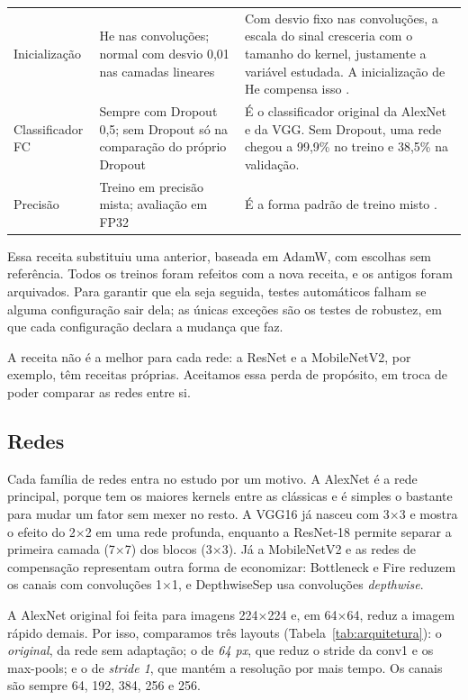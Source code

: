 \documentclass[conference]{IEEEtran}
\newcommand{\by}{\ensuremath{\times}}
\begin{document}
\begin{table}[!t]
\begin{tabular}{@{}p{}p{}p{}@{}}
Inicialização & He nas convoluções; normal com desvio 0,01 nas camadas lineares & Com desvio fixo nas convoluções, a escala do sinal cresceria com o tamanho do kernel, justamente a variável estudada. A inicialização de He compensa isso \cite{he2015delving}. \\
Classificador FC & Sempre com Dropout 0,5; sem Dropout só na comparação do próprio Dropout & É o classificador original da AlexNet e da VGG. Sem Dropout, uma rede chegou a 99,9\% no treino e 38,5\% na validação. \\
Precisão & Treino em precisão mista; avaliação em FP32 & É a forma padrão de treino misto \cite{micikevicius2018mixed}. \\
\bottomrule
\end{tabular}
\end{table}

Essa receita substituiu uma anterior, baseada em AdamW, com escolhas sem referência. Todos os treinos foram refeitos com a nova receita,
e os antigos foram arquivados. Para garantir que ela seja seguida, testes automáticos falham se alguma configuração sair dela; as únicas
exceções são os testes de robustez, em que cada configuração declara a mudança que faz.

A receita não é a melhor para cada rede: a ResNet e a MobileNetV2, por exemplo, têm receitas próprias. Aceitamos essa perda de
propósito, em troca de poder comparar as redes entre si.

\subsection{Redes}

Cada família de redes entra no estudo por um motivo. A AlexNet é a rede principal, porque tem os maiores kernels entre as clássicas e é
simples o bastante para mudar um fator sem mexer no resto. A VGG16 já nasceu com 3\by3 e mostra o efeito do 2\by2 em uma rede profunda,
enquanto a ResNet-18 permite separar a primeira camada (7\by7) dos blocos (3\by3). Já a MobileNetV2 e as redes de compensação
representam outra forma de economizar: Bottleneck e Fire \cite{iandola2016squeezenet} reduzem os canais com convoluções 1\by1, e
DepthwiseSep usa convoluções \textit{depthwise}.

A AlexNet original foi feita para imagens 224\by224 e, em 64\by64, reduz a imagem rápido demais. Por isso, comparamos três layouts
(Tabela~\ref{tab:arquitetura}): o \textit{original}, da rede sem adaptação; o de \textit{64 px}, que reduz o stride da conv1 e os
max-pools; e o de \textit{stride 1}, que mantém a resolução por mais tempo. Os canais são sempre 64, 192, 384, 256 e 256.
\end{document}
